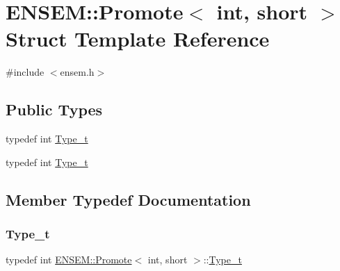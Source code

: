 \hypertarget{structENSEM_1_1Promote_3_01int_00_01short_01_4}{}\section{E\+N\+S\+EM\+:\+:Promote$<$ int, short $>$ Struct Template Reference}
\label{structENSEM_1_1Promote_3_01int_00_01short_01_4}


{\ttfamily \#include $<$ensem.\+h$>$}

\subsection*{Public Types}
\begin{DoxyCompactItemize}
\item 
typedef int \mbox{\hyperlink{structENSEM_1_1Promote_3_01int_00_01short_01_4_ad2e469fb4504abcc6e15dac9af8a8078}{Type\+\_\+t}}
\item 
typedef int \mbox{\hyperlink{structENSEM_1_1Promote_3_01int_00_01short_01_4_ad2e469fb4504abcc6e15dac9af8a8078}{Type\+\_\+t}}
\end{DoxyCompactItemize}


\subsection{Member Typedef Documentation}
\mbox{\label{structENSEM_1_1Promote_3_01int_00_01short_01_4_ad2e469fb4504abcc6e15dac9af8a8078}} 
\subsubsection{\texorpdfstring{Type\_t}{Type\_t}\hspace{0.1cm}{\footnotesize\ttfamily [1/2]}}
{\footnotesize\ttfamily typedef int \mbox{\hyperlink{structENSEM_1_1Promote}{E\+N\+S\+E\+M\+::\+Promote}}$<$ int, short $>$\+::\mbox{\hyperlink{structENSEM_1_1Promote_3_01int_00_01short_01_4_ad2e469fb4504abcc6e15dac9af8a8078}{Type\+\_\+t}}}

\mbox{\label{structENSEM_1_1Promote_3_01int_00_01short_01_4_ad2e469fb4504abcc6e15dac9af8a8078}} 
